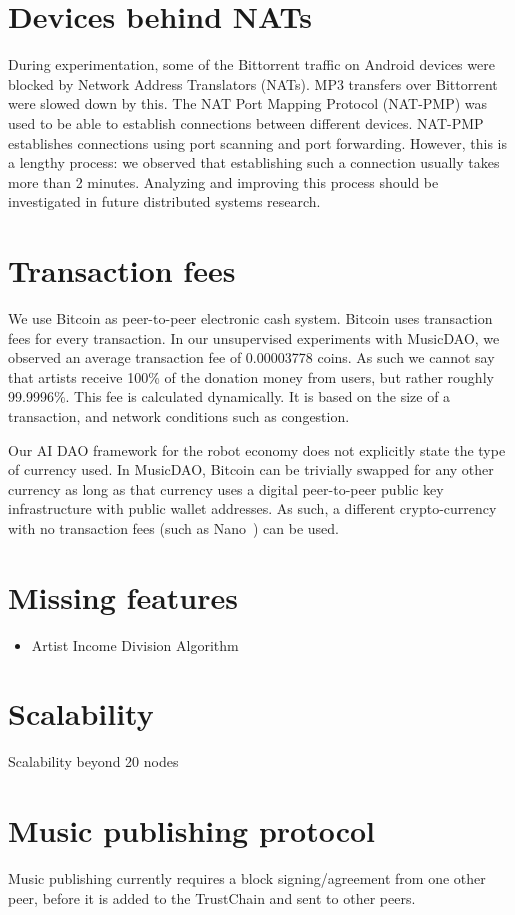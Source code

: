 \section{Devices behind NATs}
During experimentation, some of the Bittorrent traffic on Android devices were blocked by Network Address  Translators (NATs). MP3 transfers over Bittorrent were slowed down by this. The NAT Port Mapping Protocol (NAT-PMP) was used to be able to establish connections between different devices. NAT-PMP establishes connections using port scanning and port forwarding. However, this is a lengthy process: we observed that establishing such a connection usually takes more than 2 minutes. Analyzing and improving this process should be investigated in future distributed systems research.

\section{Transaction fees}
We use Bitcoin as peer-to-peer electronic cash system. Bitcoin uses transaction fees for every transaction. In our unsupervised experiments with MusicDAO, we observed an average transaction fee of 0.00003778 coins. As such we cannot say that artists receive 100\% of the donation money from users, but rather roughly 99.9996\%. This fee is calculated dynamically. It is based on the size of a transaction, and network conditions such as congestion. 

Our AI DAO framework for the robot economy does not explicitly state the type of currency used. In MusicDAO, Bitcoin can be trivially swapped for any other currency as long as that currency uses a digital peer-to-peer public key infrastructure with public wallet addresses. As such, a different crypto-currency with no transaction fees (such as Nano~\citep{lemahieu2018nano}) can be used.

\section{Missing features}
\begin{itemize}
    \item Artist Income Division Algorithm
\end{itemize}
\section{Scalability}
Scalability beyond 20 nodes
\section{Music publishing protocol}
Music publishing currently requires a block signing/agreement from one other peer, before it is added to the TrustChain and sent to other peers.  
